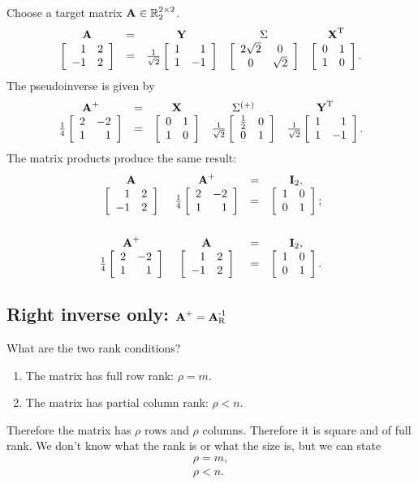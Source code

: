Choose a target matrix $\A{}\in\real{\by{2}{2}}_{2}$.
\begin{equation*}
  \begin{array}{ccccc}
    \A{} &=& \Y{} & \sig{} & \X{T} \\
    \mat{rr}{1&2\\-1&2} &=& \frac{1}{\sqrt{2}}\mat{rr}{1&1\\1&-1} & \mat{cc}{2\sqrt{2}&0\\0&\sqrt{2}} & \mat{cc}{0&1\\1&0}.
  \end{array}
\end{equation*}
The pseudoinverse is given by
\begin{equation*}
  \begin{array}{ccccc}
    \Ap &=& \X{} & \index{Sigma matrix!inverse}\sig{(+)} & \Y{T} \\
    \frac{1}{4}\mat{rr}{2&-2\\1&1} &=& \mat{cc}{0&1\\1&0} & \frac{1}{\sqrt{2}}\mat{cc}{\frac{1}{2}&0\\0&1} & \frac{1}{\sqrt{2}}\mat{rr}{1&1\\1&-1}.
  \end{array}
\end{equation*}
The matrix products produce the same result:
\begin{equation*}
  \begin{array}{cccc}
  \A{}&\Ap&=&\I{2},\\
  \mat{rr}{1&2\\-1&2} &
  \frac{1}{4}\mat{rr}{2&-2\\1&1} & = &
  \itwo;\\[25pt]
  \Ap&\A{}&=&\I{2},\\
  \frac{1}{4}\mat{rr}{2&-2\\1&1} &
  \mat{rr}{1&2\\-1&2} & = &
  \itwo.
  \end{array}
\end{equation*}

\subsection{Right inverse only: $\Ap=\AinvR$}
What are the two rank conditions?
\begin{enumerate}
\item The matrix has full row rank: $\rho = m$.
\item The matrix has partial column rank: $\rho < n$.
\end{enumerate}
Therefore the matrix has $\rho$ rows and $\rho$ columns. Therefore it is square and of full rank. We don't know what the rank is or what the size is, but we can state
\begin{equation}
  \begin{split}
     \rho = m,\\
     \rho < n.
  \end{split}
\end{equation}


